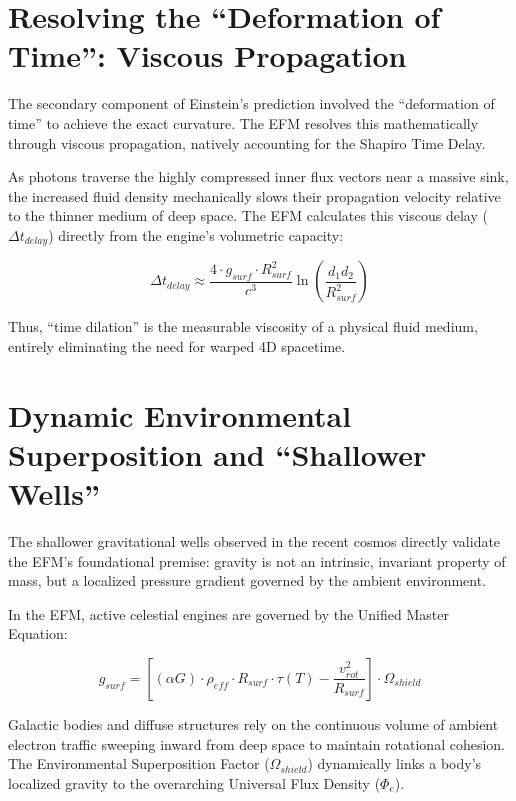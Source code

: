 \documentclass[11pt, a4paper]{article}
\begin{document}
\section{Resolving the ``Deformation of Time'': Viscous Propagation}
The secondary component of Einstein's prediction involved the ``deformation of time'' to achieve the exact curvature. The EFM resolves this mathematically through viscous propagation, natively accounting for the Shapiro Time Delay.

As photons traverse the highly compressed inner flux vectors near a massive sink, the increased fluid density mechanically slows their propagation velocity relative to the thinner medium of deep space. The EFM calculates this viscous delay ($\Delta t_{delay}$) directly from the engine's volumetric capacity:

\begin{equation}
  \Delta t_{delay} \approx \frac{4 \cdot g_{surf} \cdot R_{surf}^2}{c^3} \ln\left(\frac{d_1 d_2}{R_{surf}^2}\right)
\end{equation}

Thus, ``time dilation'' is the measurable viscosity of a physical fluid medium, entirely eliminating the need for warped 4D spacetime.

\clearpage
\section{Dynamic Environmental Superposition and ``Shallower Wells''}
The shallower gravitational wells observed in the recent cosmos directly validate the EFM's foundational premise: gravity is not an intrinsic, invariant property of mass, but a localized pressure gradient governed by the ambient environment. 

In the EFM, active celestial engines are governed by the Unified Master Equation:

\begin{equation}
  g_{surf} = \left[ (\alpha G) \cdot \rho_{eff} \cdot R_{surf} \cdot \tau(T) - \frac{v_{rot}^2}{R_{surf}} \right] \cdot \Omega_{shield}
\end{equation}

Galactic bodies and diffuse structures rely on the continuous volume of ambient electron traffic sweeping inward from deep space to maintain rotational cohesion. The Environmental Superposition Factor ($\Omega_{shield}$) dynamically links a body's localized gravity to the overarching Universal Flux Density ($\Phi_e$).
\end{document}
